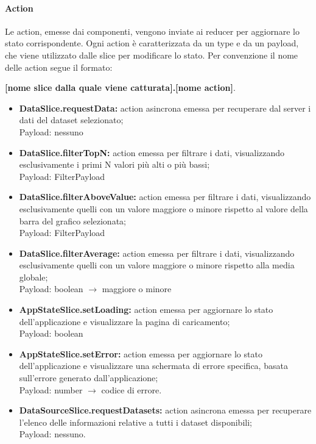 \paragraph{Action}
Le action, emesse dai componenti, vengono inviate ai reducer per aggiornare lo
stato corrispondente. Ogni action è caratterizzata da un type e da un payload,
che viene utilizzato dalle slice per modificare lo stato. Per convenzione il
nome delle action segue il formato: \\
\begin{center}
    \textbf{[nome slice dalla quale viene catturata].[nome action]}.
\end{center}
\begin{itemize}
    \item \textbf{DataSlice.requestData:} action asincrona emessa per recuperare dal server i dati del dataset selezionato; \\ Payload: nessuno
    \item \textbf{DataSlice.filterTopN:} action emessa per filtrare i dati, visualizzando esclusivamente i primi N valori più alti o più bassi; \\ Payload: FilterPayload
    \item \textbf{DataSlice.filterAboveValue:} action emessa per filtrare i dati, visualizzando esclusivamente quelli con un valore maggiore o minore rispetto al valore della barra del grafico selezionata;\\ Payload: FilterPayload
    \item \textbf{DataSlice.filterAverage:} action emessa per filtrare i dati, visualizzando esclusivamente quelli con un valore maggiore o minore rispetto alla media globale; \\ Payload: boolean $\rightarrow$ maggiore o minore
    \item \textbf{AppStateSlice.setLoading:} action emessa per aggiornare lo stato dell'applicazione e visualizzare la pagina di caricamento; \\ Payload: boolean
    \item \textbf{AppStateSlice.setError:} action emessa per aggiornare lo stato dell'applicazione e visualizzare una schermata di errore specifica, basata sull'errore generato dall'applicazione; \\ Payload: number $\rightarrow$ codice di errore.
    \item \textbf{DataSourceSlice.requestDatasets:} action asincrona emessa per recuperare l'elenco delle informazioni relative a tutti i dataset disponibili; \\ Payload: nessuno.

\end{itemize}
